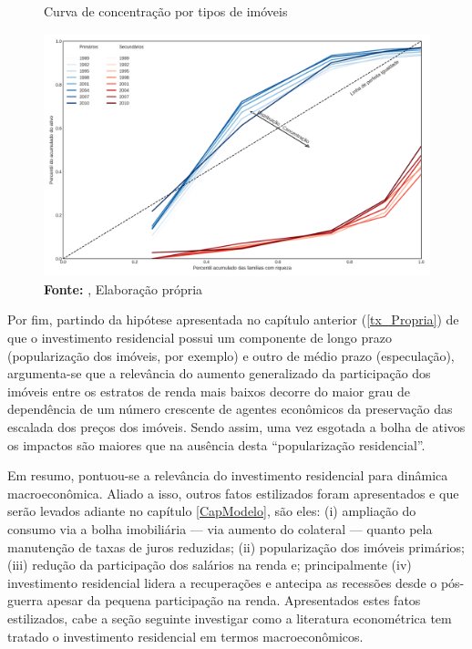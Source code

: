 \begin{figure}[H]
	\centering
	\caption{Curva de concentração por tipos de imóveis}
	\label{FigConcentracao}
	\includegraphics[width=\textwidth]{../../Dados/Fatos_Estilizados/figs/Concentracao_Imoveis.png}
	\caption*{\textbf{Fonte:} \textcite{us_census_bureau_characteristics_2017}, Elaboração própria}
\end{figure}
Por fim, partindo da hipótese apresentada no capítulo anterior (\ref{tx_Propria}) de que o investimento residencial possui um componente de longo prazo (popularização dos imóveis, por exemplo) e outro de médio prazo (especulação), argumenta-se que a relevância do aumento generalizado da participação dos imóveis entre os estratos de renda mais baixos decorre do maior grau de dependência de um número crescente de agentes econômicos da preservação das escalada dos preços dos imóveis.
Sendo assim, uma vez esgotada a bolha de ativos os impactos são maiores que na ausência desta ``popularização residencial''.

Em resumo, pontuou-se a relevância do investimento residencial para dinâmica macroeconômica.
Aliado a isso, outros fatos estilizados foram apresentados e que serão levados adiante no capítulo \ref{CapModelo}, são eles:
	(i) ampliação do consumo via a bolha imobiliária --- via aumento do colateral --- quanto pela manutenção de taxas de juros reduzidas;
	(ii) popularização dos imóveis primários;
	(iii) redução da participação dos salários na renda e; principalmente 
	(iv) investimento residencial lidera a recuperações e antecipa as recessões desde o pós-guerra apesar da pequena participação na renda.
Apresentados estes fatos estilizados, cabe a seção seguinte investigar como a literatura econométrica tem tratado o investimento residencial em termos macroeconômicos.

